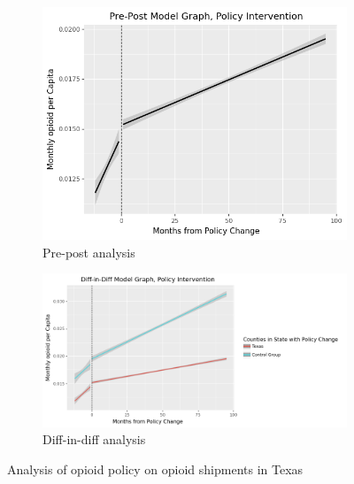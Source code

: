 \documentclass[12pt,letterpaper]{article}
\begin{document}
\begin{figure}[!h]
\centering
\begin{subfigure}{.5\textwidth}
  \centering
  \includegraphics[width=0.7\linewidth]{../30_results/Bonus_Results/texas_opioid_shipment_prepost_monthly.png}
  \caption{Pre-post analysis}
  \label{fig:tx_ship_prepost}
\end{subfigure}%
\begin{subfigure}{.55\textwidth}
  \centering
  \includegraphics[width=1\linewidth]{../30_results/Bonus_Results/texas_opioid_shipment_diffdiff_monthly.png}
  \caption{Diff-in-diff analysis}
  \label{fig:tx_ship_did}
\end{subfigure}
\caption{Analysis of opioid policy on opioid shipments in Texas}
\label{fig:tx_ship}
\end{figure}
\end{document}
